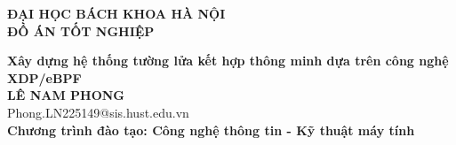 \documentclass[main.tex]{subfiles}
\begin{document}
\begin{titlepage}
\thispagestyle{empty}
\begin{center}

{\textbf{\large{ĐẠI HỌC BÁCH KHOA HÀ NỘI}}}\\[4cm]

{\textbf{\huge{ ĐỒ ÁN TỐT NGHIỆP}}}\\[1cm]
{\textbf{\Large{Xây dựng hệ thống tường lửa kết hợp thông minh dựa trên công nghệ XDP/eBPF}}\\[1cm]

{\textbf{\large{LÊ NAM PHONG}}}\\
{\large{Phong.LN225149@sis.hust.edu.vn}}\\[0.5cm]

{\textbf{\large{Chương trình đào tạo: Công nghệ thông tin - Kỹ thuật máy tính
}}}\\

\vspace{4cm}
\begin{table}[H]
\centering
{}
\end{table}}
\end{center}



\end{titlepage}
\end{document}
